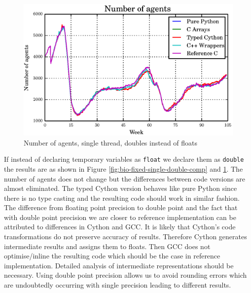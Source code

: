 \documentclass[12pt, a4paper]{report}
\begin{document}
\begin{appendices}
\begin{figure}[H]
  \begin{center}
    \includegraphics[width=\columnwidth]{graphs/ag-fixed-single-double-comp.eps}
    \caption{Number of agents, single thread, doubles instead of floats}
    \label{fig:ag-fixed-single-double-comp}
  \end{center}
\end{figure}

If instead of declaring temporary variables as \lstinline{float} we declare them
as \lstinline{double} the results are as shown in Figure \ref{fig:bio-fixed-single-double-comp}
and \ref{fig:ag-fixed-single-double-comp}. The number of agents does not change but
the differences between code versions are almost eliminated. The typed Cython version
behaves like pure Python since there is no type casting and the resulting code
should work in similar fashion. The difference from floating point precision
to double point and the fact that with double point precision we are closer to reference
implementation can be attributed to differences in Cython and GCC. It is likely
that Cython's code transformations do not preserve accuracy of results. Therefore
Cython generates intermediate results and assigns them to floats. Then GCC does not
optimise/inline the resulting code which should be the case in reference implementation.
Detailed analysis of intermediate representations should be necessary. Using double
point precision allows us to avoid rounding errors which are undoubtedly occurring with
single precision leading to different results.


\end{appendices}
\end{document}
